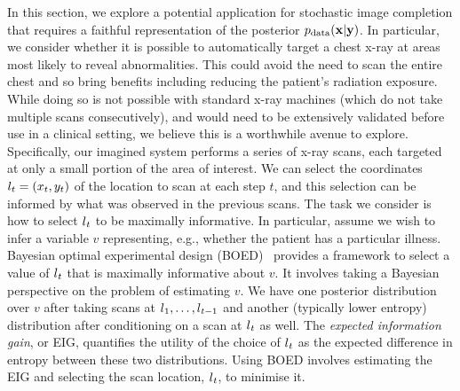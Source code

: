 In this section, we explore a potential application for stochastic image completion that
requires a faithful representation of the posterior $p_{\rm{data}}({\mathbf{x}}|{\mathbf{y}})$.
%
In particular, we consider whether it is possible to automatically target a
chest x-ray at areas most likely to reveal abnormalities. This could avoid the
need to scan the entire chest and so bring benefits including reducing the
patient's radiation exposure.
%
While doing so is not possible with standard x-ray machines (which do not take
multiple scans consecutively), and would need to be extensively validated before
use in a clinical setting, we believe this is a worthwhile avenue to explore.
%
Specifically, our imagined system performs a series of x-ray scans, each
targeted at only a small portion of the area of interest. We can select the
coordinates $l_t = (x_t, y_t)$ of the location to scan at each step $t$, and
this selection can be informed by what was observed in the previous scans. The
task we consider is how to select $l{}_t$ to be maximally informative. In
particular, assume we wish to infer a variable $v$ representing, e.g., whether
the patient has a particular illness. Bayesian optimal experimental design
(BOED)~\citep{chaloner1995bayesian} provides a framework to select a value of
$l{}_t$ that is maximally informative about $v$.
%
It involves taking a Bayesian perspective on the problem of estimating $v$. We
have one posterior distribution over $v$ after taking scans at
$l{}_1,\ldots,l{}_{t-1}$ and another (typically lower entropy) distribution after
conditioning on a scan at $l{}_t$ as well.
%
The \textit{expected information gain}, or EIG, quantifies the utility of the
choice of $l{}_t$ as the expected difference in entropy between these two
distributions. Using BOED involves estimating the EIG and selecting the scan
location, $l{}_t$, to minimise it.

